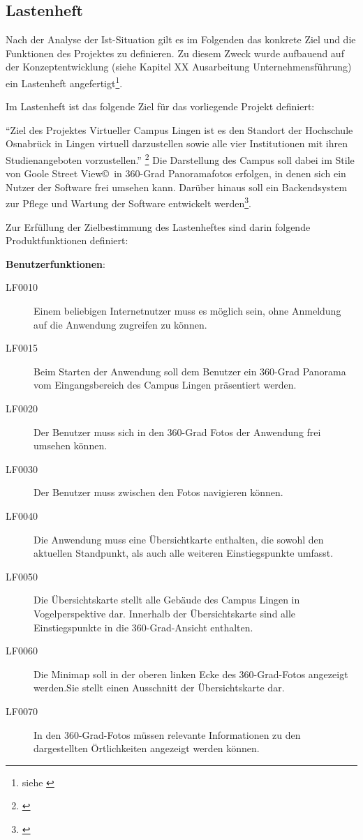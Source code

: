 \subsection{Lastenheft}
\label{sec:Lastenheft}

Nach der Analyse der Ist-Situation gilt es im Folgenden das konkrete Ziel und die Funktionen des Projektes zu definieren. 
Zu diesem Zweck wurde aufbauend auf der Konzeptentwicklung (siehe Kapitel XX Ausarbeitung Unternehmensführung) ein 
Lastenheft angefertigt\footnote{siehe \citet{lastenheft2013}}.

Im Lastenheft ist das folgende Ziel für das vorliegende Projekt definiert:

"`Ziel des Projektes Virtueller Campus Lingen ist es den Standort der Hochschule Osnabrück
in Lingen virtuell darzustellen sowie alle vier Institutionen mit ihren Studienangeboten
vorzustellen."' \footnote{\citet{lastenheft2013}}
Die Darstellung des Campus soll dabei im Stile von Goole Street View\copyright\ in 360-Grad Panoramafotos erfolgen, in 
denen sich ein Nutzer der Software frei umsehen kann. Darüber hinaus soll ein Backendsystem zur Pflege und Wartung der 
Software entwickelt werden\footnote{\citet{lastenheft2013}}.

Zur Erfüllung der Zielbestimmung des Lastenheftes sind darin folgende Produktfunktionen definiert:

\textbf{Benutzerfunktionen}:

\begin{description}
  \item[LF0010] Einem beliebigen Internetnutzer muss es möglich sein, ohne Anmeldung auf die Anwendung zugreifen zu können.
  \item[LF0015] Beim Starten der Anwendung soll dem Benutzer ein 360-Grad Panorama vom Eingangsbereich des Campus Lingen 
  präsentiert werden.
  \item[LF0020] Der Benutzer muss sich in den 360-Grad Fotos der Anwendung frei umsehen können.
  \item[LF0030] Der Benutzer muss zwischen den Fotos navigieren können.
  \item[LF0040] Die Anwendung muss eine Übersichtkarte enthalten, die sowohl den aktuellen Standpunkt, als auch alle 
  weiteren Einstiegspunkte umfasst.
  \item[LF0050] Die Übersichtskarte stellt alle Gebäude des Campus Lingen in Vogelperspektive dar. Innerhalb der 
  Übersichtskarte sind alle Einstiegspunkte in die 360-Grad-Ansicht enthalten.
  \item[LF0060] Die Minimap soll in der oberen linken Ecke des 360-Grad-Fotos angezeigt werden.Sie stellt einen Ausschnitt 
  der Übersichtskarte dar.
  \item[LF0070] In den 360-Grad-Fotos müssen relevante Informationen zu den dargestellten Örtlichkeiten angezeigt werden können.
\end{description}

